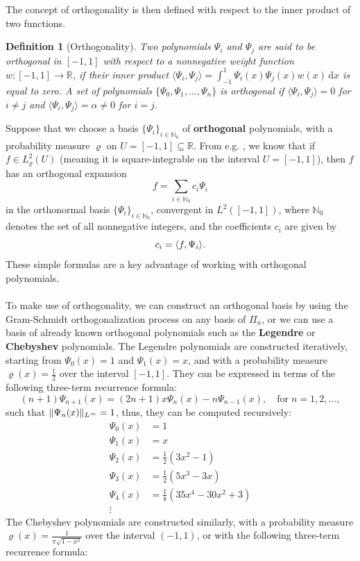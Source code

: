 \documentclass[12pt, oneside]{report}   	%
\newcommand{\R}{\mathbb{R}}
\newcommand{\N}{\mathbb{N}}
\newtheorem{defn}{Definition}
\DeclarePairedDelimiter{\norm}{\lVert}{\rVert}        %
\DeclarePairedDelimiter{\inner}{\langle}{\rangle}
\begin{document}
\noindent The concept of orthogonality is then defined with respect to the inner product of two functions.
\begin{defn}[Orthogonality]
Two polynomials $\Psi_i$ and $\Psi_j$ are said to be orthogonal in $[-1,1]$ with respect to a nonnegative weight function $w:[-1,1]\to\R$, if their inner product $\langle\Psi_i,\Psi_j\rangle = \int_{-1}^1 \! \Psi_i(x)\Psi_j(x)w(x) \, \mathrm{d}x$ is equal to zero. A set of polynomials $\{\Psi_0, \Psi_1, ..., \Psi_n\}$ is orthogonal if $\langle\Psi_i,\Psi_j\rangle = 0$ for $i \neq j$ and $\langle\Psi_i,\Psi_j\rangle = \alpha \neq 0$ for $i = j$.
\end{defn}
\smallskip
Suppose that we choose a basis $\{\Psi_i\}_{i\in\N_0}$ of \textbf{orthogonal} polynomials, with a probability measure $\varrho$ on $U=[-1,1]\subseteq\R$. From e.g. \cite{sparsepoly}, we know that if $f\in L_{\varrho}^2(U)$ (meaning it is square-integrable on the interval $U=[-1,1]$), then $f$ has an orthogonal expansion
$$
f = \sum_{i\in\N_0} c_i \Psi_i
$$
in the orthonormal basis $\{\Psi_i\}_{i\in\N_0}$, convergent in $L^2([-1,1])$, where $\N_0$ denotes the set of all nonnegative integers, and the coefficients $c_i$ are given by
$$
c_i = \inner{f,\Psi_i}.
$$
These simple formulas are a key advantage of working with orthogonal polynomials.\\\\
To make use of orthogonality, we can construct an orthogonal basis by using the Gram-Schmidt orthogonalization process on any basis of $\Pi_n$, or we can use a basis of already known orthogonal polynomials such as the \textbf{Legendre} or \textbf{Chebyshev} polynomials. The Legendre polynomials are constructed iteratively, starting from $\Psi_0(x)=1$ and $\Psi_1(x)=x$, and with a probability measure $\varrho(x)=\frac{1}{2}$ over the interval $[-1,1]$. They can be expressed in terms of the following three-term recurrence formula:
$$
(n+1)\Psi_{n+1}(x) = (2n+1)x\Psi_n(x) - n\Psi_{n-1}(x), \quad \text{for} \; n=1,2,...,
$$
such that $\norm{\Psi_n(x)}_{L^{\infty}}=1$, thus, they can be computed recursively:
\begin{align*}
\Psi_0(x) &= 1 \\
\Psi_1(x) &= x \\
\Psi_2(x) &= \frac{1}{2}(3x^2-1) \\
\Psi_3(x) &= \frac{1}{2}(5x^3-3x) \\
\Psi_4(x) &= \frac{1}{8}(35x^4-30x^2+3) \\
\vdots
\end{align*}
The Chebyshev polynomials are constructed similarly, with a probability measure $\varrho(x)=\frac{1}{\pi\sqrt{1-x^2}}$ over the interval $(-1,1)$, or with the following three-term recurrence formula:
\end{document}
